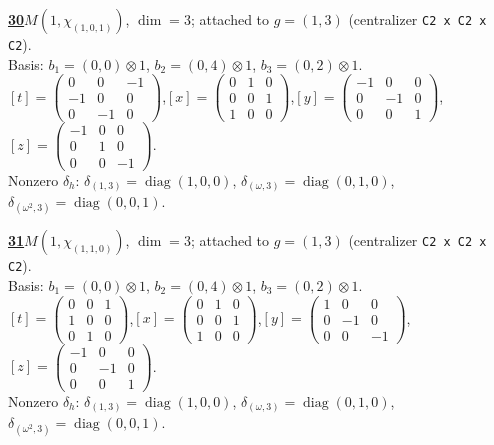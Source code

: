 \begin{samepage}\noindent\textbf{\underline{30}}\quad $M(1,\chi_{(1,0,1)})$, $\dim=3$; attached to $g=(1,3)$ (centralizer \texttt{C2 x C2 x C2}).\\
Basis: $b_{1}=(0,0)\otimes 1$, $b_{2}=(0,4)\otimes 1$, $b_{3}=(0,2)\otimes 1$.\\
$[t]=\left(\begin{smallmatrix} 0 & 0 & -1 \\ -1 & 0 & 0 \\ 0 & -1 & 0 \end{smallmatrix}\right)$,\quad $[x]=\left(\begin{smallmatrix} 0 & 1 & 0 \\ 0 & 0 & 1 \\ 1 & 0 & 0 \end{smallmatrix}\right)$,\quad $[y]=\left(\begin{smallmatrix} -1 & 0 & 0 \\ 0 & -1 & 0 \\ 0 & 0 & 1 \end{smallmatrix}\right)$,\quad $[z]=\left(\begin{smallmatrix} -1 & 0 & 0 \\ 0 & 1 & 0 \\ 0 & 0 & -1 \end{smallmatrix}\right)$.\\
Nonzero $\delta_h$: $\delta_{(1,3)}=\operatorname{diag}(1,0,0)$, $\delta_{(\omega,3)}=\operatorname{diag}(0,1,0)$, $\delta_{(\omega^2,3)}=\operatorname{diag}(0,0,1)$.\end{samepage}
\medskip

\begin{samepage}\noindent\textbf{\underline{31}}\quad $M(1,\chi_{(1,1,0)})$, $\dim=3$; attached to $g=(1,3)$ (centralizer \texttt{C2 x C2 x C2}).\\
Basis: $b_{1}=(0,0)\otimes 1$, $b_{2}=(0,4)\otimes 1$, $b_{3}=(0,2)\otimes 1$.\\
$[t]=\left(\begin{smallmatrix} 0 & 0 & 1 \\ 1 & 0 & 0 \\ 0 & 1 & 0 \end{smallmatrix}\right)$,\quad $[x]=\left(\begin{smallmatrix} 0 & 1 & 0 \\ 0 & 0 & 1 \\ 1 & 0 & 0 \end{smallmatrix}\right)$,\quad $[y]=\left(\begin{smallmatrix} 1 & 0 & 0 \\ 0 & -1 & 0 \\ 0 & 0 & -1 \end{smallmatrix}\right)$,\quad $[z]=\left(\begin{smallmatrix} -1 & 0 & 0 \\ 0 & -1 & 0 \\ 0 & 0 & 1 \end{smallmatrix}\right)$.\\
Nonzero $\delta_h$: $\delta_{(1,3)}=\operatorname{diag}(1,0,0)$, $\delta_{(\omega,3)}=\operatorname{diag}(0,1,0)$, $\delta_{(\omega^2,3)}=\operatorname{diag}(0,0,1)$.\end{samepage}
\medskip

